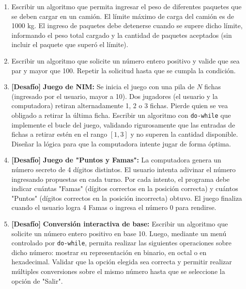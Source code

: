 \begin{ejercicioClase}
\begin{enumerate}
    \item Escribir un algoritmo que permita ingresar el peso de diferentes paquetes que se deben cargar en un camión. El límite máximo de carga del camión es de 1000 kg. El ingreso de paquetes debe detenerse cuando se supere dicho límite, informando el peso total cargado y la cantidad de paquetes aceptados (sin incluir el paquete que superó el límite).
    \item Escribir un algoritmo que solicite un número entero positivo y valide que sea par y mayor que 100. Repetir la solicitud hasta que se cumpla la condición.
    \item \textbf{[Desafío]} \textbf{Juego de NIM:} Se inicia el juego con una pila de $N$ fichas (ingresado por el usuario, mayor a 10). Dos jugadores (el usuario y la computadora) retiran alternadamente 1, 2 o 3 fichas. Pierde quien se vea obligado a retirar la última ficha. Escribir un algoritmo con \texttt{do-while} que implemente el bucle del juego, validando rigurosamente que las entradas de fichas a retirar estén en el rango $[1, 3]$ y no superen la cantidad disponible. Diseñar la lógica para que la computadora intente jugar de forma óptima.
    \item \textbf{[Desafío]} \textbf{Juego de "Puntos y Famas":} La computadora genera un número secreto de 4 dígitos distintos. El usuario intenta adivinar el número ingresando propuestas en cada turno. Por cada intento, el programa debe indicar cuántas "Famas" (dígitos correctos en la posición correcta) y cuántos "Puntos" (dígitos correctos en la posición incorrecta) obtuvo. El juego finaliza cuando el usuario logra 4 Famas o ingresa el número 0 para rendirse.
    \item \textbf{[Desafío]} \textbf{Conversión interactiva de base:} Escribir un algoritmo que solicite un número entero positivo en base 10. Luego, mediante un menú controlado por \texttt{do-while}, permita realizar las siguientes operaciones sobre dicho número: mostrar su representación en binario, en octal o en hexadecimal. Validar que la opción elegida sea correcta y permitir realizar múltiples conversiones sobre el mismo número hasta que se seleccione la opción de "Salir".
  \end{enumerate}
\end{ejercicioClase}


